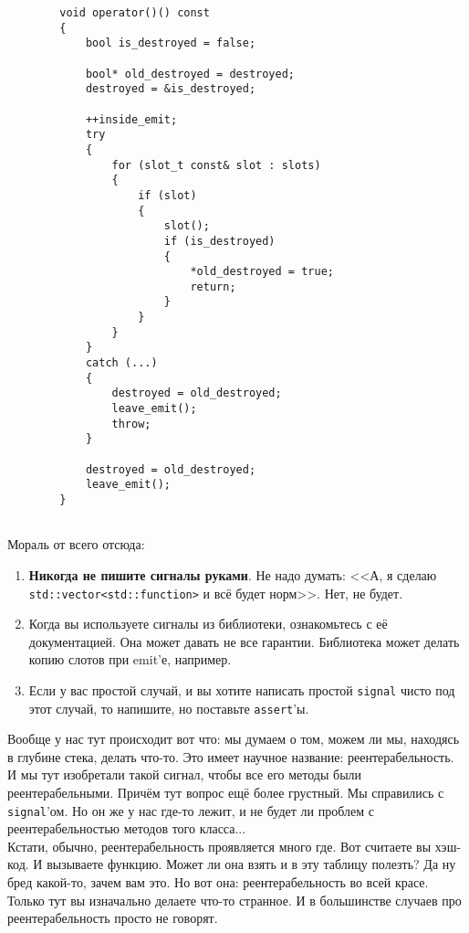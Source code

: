 \documentclass{article}
\begin{document}
    \begin{verbatim}
        void operator()() const
        {
            bool is_destroyed = false;
            
            bool* old_destroyed = destroyed;
            destroyed = &is_destroyed;
            
            ++inside_emit;
            try
            {
                for (slot_t const& slot : slots)
                {
                    if (slot)
                    {
                        slot();
                        if (is_destroyed)
                        {
                            *old_destroyed = true;
                            return;
                        }
                    }
                }
            }
            catch (...)
            {
                destroyed = old_destroyed;
                leave_emit();
                throw;
            }
            
            destroyed = old_destroyed;
            leave_emit();
        }
        
    \end{verbatim}
    Мораль от всего отсюда:
    \begin{enumerate}
        \item \textbf{Никогда не пишите сигналы руками}. Не надо думать: <<А, я сделаю \texttt{std::vector<std::function>} и всё будет норм>>. Нет, не будет.
        \item Когда вы используете сигналы из библиотеки, ознакомьтесь с её документацией. Она может давать не все гарантии. Библиотека может делать копию слотов при emit'е, например.
        \item Если у вас простой случай, и вы хотите написать простой \texttt{signal} чисто под этот случай, то напишите, но поставьте \texttt{assert}'ы.
    \end{enumerate}
    Вообще у нас тут происходит вот что: мы думаем о том, можем ли мы, находясь в глубине стека, делать что-то. Это имеет научное название: реентерабельность. И мы тут изобретали такой сигнал, чтобы все его методы были реентерабельными. Причём тут вопрос ещё более грустный. Мы справились с \texttt{signal}'ом. Но он же у нас где-то лежит, и не будет ли проблем с реентерабельностью методов того класса...\\
    Кстати, обычно, реентерабельность проявляется много где. Вот считаете вы хэш-код. И вызываете функцию. Может ли она взять и в эту таблицу полезть? Да ну бред какой-то, зачем вам это. Но вот она: реентерабельность во всей красе. Только тут вы изначально делаете что-то странное. И в большинстве случаев про реентерабельность просто не говорят.
\end{document}

